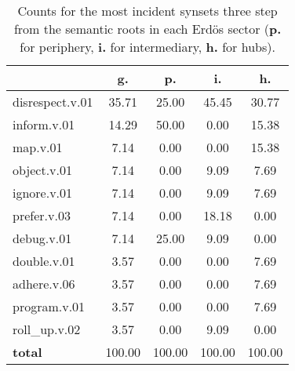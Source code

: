 \begin{table}[h!]
\begin{center}
\begin{tabular}{| l || c | c | c | c |}\hline
 & {\bf g.} & {\bf p.} & {\bf i.} & {\bf h.} \\\hline\hline
disrespect.v.01 & 35.71  & 25.00  & 45.45  & 30.77 \\\hline
inform.v.01 & 14.29  & 50.00  & 0.00  & 15.38 \\\hline
map.v.01 & 7.14  & 0.00  & 0.00  & 15.38 \\\hline
object.v.01 & 7.14  & 0.00  & 9.09  & 7.69 \\\hline
ignore.v.01 & 7.14  & 0.00  & 9.09  & 7.69 \\\hline
prefer.v.03 & 7.14  & 0.00  & 18.18  & 0.00 \\\hline
debug.v.01 & 7.14  & 25.00  & 9.09  & 0.00 \\\hline
double.v.01 & 3.57  & 0.00  & 0.00  & 7.69 \\\hline
adhere.v.06 & 3.57  & 0.00  & 0.00  & 7.69 \\\hline
program.v.01 & 3.57  & 0.00  & 0.00  & 7.69 \\\hline
roll\_up.v.02 & 3.57  & 0.00  & 9.09  & 0.00 \\\hline\hline
{{\bf total}} & 100.00  & 100.00  & 100.00  & 100.00 \\\hline
\end{tabular}
\caption{Counts for the most incident synsets three step from the semantic roots in each Erd\"os sector ({\bf p.} for periphery, {\bf i.} for intermediary, {\bf h.} for hubs).}
\end{center}
\end{table}
